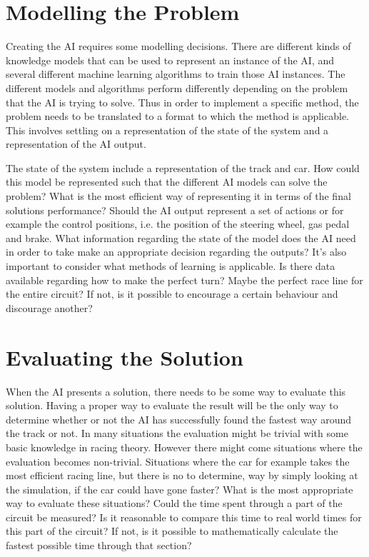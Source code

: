 \section{Modelling the Problem}
Creating the AI requires some modelling decisions. There are different kinds of knowledge models that can be used to represent an instance of the AI, and several different machine learning algorithms to train those AI instances. The different models and algorithms perform differently depending on the problem that the AI is trying to solve. Thus in order to implement a specific method, the problem needs to be translated to a format to which the method is applicable. This involves settling on a representation of the state of the system and a representation of the AI output.

The state of the system include a representation of the track and car. How could this model be represented such that the different AI models can solve the problem? What is the most efficient way of representing it in terms of the final solutions performance? Should the AI output represent a set of actions or for example the control positions, i.e. the position of the steering wheel, gas pedal and brake. What information regarding the state of the model does the AI need in order to take make an appropriate decision regarding the outputs? It's also important to consider what methods of learning is applicable. Is there data available regarding how to make the perfect turn? Maybe the perfect race line for the entire circuit? If not, is it possible to encourage a certain behaviour and discourage another?

\section{Evaluating the Solution}
When the AI presents a solution, there needs to be some way to evaluate this solution. Having a proper way to evaluate the result will be the only way to determine whether or not the AI has successfully found the fastest way around the track or not. In many situations the evaluation might be trivial with some basic knowledge in racing theory. However there might come situations where the evaluation becomes non-trivial. Situations where the car for example takes the most efficient racing line, but there is no to determine, way by simply looking at the simulation, if the car could have gone faster? What is the most appropriate way to evaluate these situations? Could the time spent through a part of the circuit be measured? Is it reasonable to compare this time to real world times for this part of the circuit? If not, is it possible to mathematically calculate the fastest possible time through that section?


